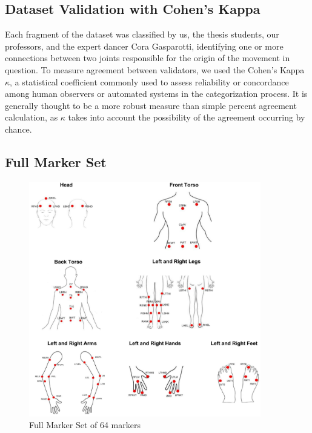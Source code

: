 \subsection{Dataset Validation with Cohen's Kappa}
Each fragment of the dataset was classified by us, the thesis students, our professors, and the expert dancer Cora Gasparotti, identifying one or more connections between two joints responsible for the origin of the movement in question.
To measure agreement between validators, we used the Cohen's Kappa $\kappa$, a statistical coefficient commonly used to assess reliability or concordance among human observers or automated systems in the categorization process.
It is generally thought to be a more robust measure than simple percent agreement calculation, as $\kappa$ takes into account the possibility of the agreement occurring by chance.



\subsection{Full Marker Set}

\begin{figure}[H]
    \centering
    \includegraphics[width=0.9\textwidth]{graphics/full_marker_set.png}
    \caption{Full Marker Set of 64 markers}
    \label{fig:full_marker_set}
\end{figure}


